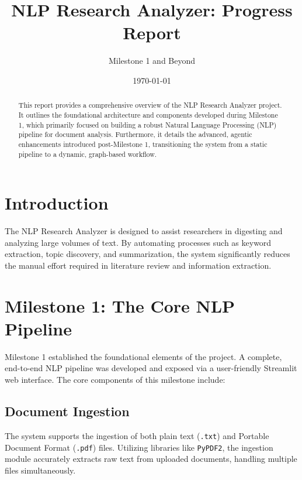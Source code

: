 \documentclass[12pt, a4paper]{article}
\title{\textbf{NLP Research Analyzer: Progress Report}}
\author{Milestone 1 and Beyond}
\date{\today}
\begin{document}
\maketitle

\begin{abstract}
This report provides a comprehensive overview of the NLP Research Analyzer project. It outlines the foundational architecture and components developed during Milestone 1, which primarily focused on building a robust Natural Language Processing (NLP) pipeline for document analysis. Furthermore, it details the advanced, agentic enhancements introduced post-Milestone 1, transitioning the system from a static pipeline to a dynamic, graph-based workflow.
\end{abstract}

\section{Introduction}
The NLP Research Analyzer is designed to assist researchers in digesting and analyzing large volumes of text. By automating processes such as keyword extraction, topic discovery, and summarization, the system significantly reduces the manual effort required in literature review and information extraction.

\section{Milestone 1: The Core NLP Pipeline}
Milestone 1 established the foundational elements of the project. A complete, end-to-end NLP pipeline was developed and exposed via a user-friendly Streamlit web interface. The core components of this milestone include:

\subsection{Document Ingestion}
The system supports the ingestion of both plain text (\texttt{.txt}) and Portable Document Format (\texttt{.pdf}) files. Utilizing libraries like \texttt{PyPDF2}, the ingestion module accurately extracts raw text from uploaded documents, handling multiple files simultaneously.
\end{document}
